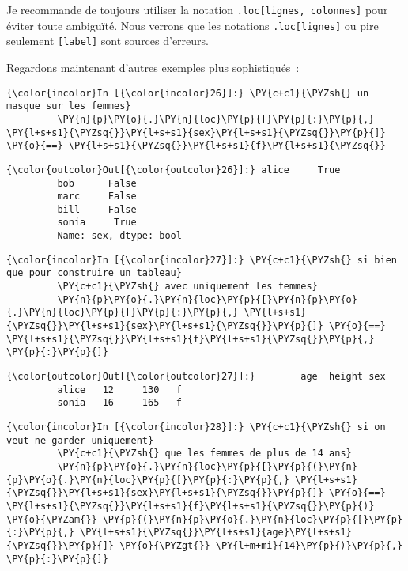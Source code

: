 Je recommande de toujours utiliser la notation
\texttt{.loc{[}lignes,\ colonnes{]}} pour éviter toute ambiguïté. Nous
verrons que les notations \texttt{.loc{[}lignes{]}} ou pire seulement
\texttt{{[}label{]}} sont sources d'erreurs.

Regardons maintenant d'autres exemples plus sophistiqués~:

    \begin{Verbatim}[commandchars=\\\{\}]
{\color{incolor}In [{\color{incolor}26}]:} \PY{c+c1}{\PYZsh{} un masque sur les femmes}
         \PY{n}{p}\PY{o}{.}\PY{n}{loc}\PY{p}{[}\PY{p}{:}\PY{p}{,} \PY{l+s+s1}{\PYZsq{}}\PY{l+s+s1}{sex}\PY{l+s+s1}{\PYZsq{}}\PY{p}{]} \PY{o}{==} \PY{l+s+s1}{\PYZsq{}}\PY{l+s+s1}{f}\PY{l+s+s1}{\PYZsq{}}
\end{Verbatim}


\begin{Verbatim}[commandchars=\\\{\}]
{\color{outcolor}Out[{\color{outcolor}26}]:} alice     True
         bob      False
         marc     False
         bill     False
         sonia     True
         Name: sex, dtype: bool
\end{Verbatim}
            
    \begin{Verbatim}[commandchars=\\\{\}]
{\color{incolor}In [{\color{incolor}27}]:} \PY{c+c1}{\PYZsh{} si bien que pour construire un tableau}
         \PY{c+c1}{\PYZsh{} avec uniquement les femmes}
         \PY{n}{p}\PY{o}{.}\PY{n}{loc}\PY{p}{[}\PY{n}{p}\PY{o}{.}\PY{n}{loc}\PY{p}{[}\PY{p}{:}\PY{p}{,} \PY{l+s+s1}{\PYZsq{}}\PY{l+s+s1}{sex}\PY{l+s+s1}{\PYZsq{}}\PY{p}{]} \PY{o}{==} \PY{l+s+s1}{\PYZsq{}}\PY{l+s+s1}{f}\PY{l+s+s1}{\PYZsq{}}\PY{p}{,} \PY{p}{:}\PY{p}{]}
\end{Verbatim}


\begin{Verbatim}[commandchars=\\\{\}]
{\color{outcolor}Out[{\color{outcolor}27}]:}        age  height sex
         alice   12     130   f
         sonia   16     165   f
\end{Verbatim}
            
    \begin{Verbatim}[commandchars=\\\{\}]
{\color{incolor}In [{\color{incolor}28}]:} \PY{c+c1}{\PYZsh{} si on veut ne garder uniquement}
         \PY{c+c1}{\PYZsh{} que les femmes de plus de 14 ans}
         \PY{n}{p}\PY{o}{.}\PY{n}{loc}\PY{p}{[}\PY{p}{(}\PY{n}{p}\PY{o}{.}\PY{n}{loc}\PY{p}{[}\PY{p}{:}\PY{p}{,} \PY{l+s+s1}{\PYZsq{}}\PY{l+s+s1}{sex}\PY{l+s+s1}{\PYZsq{}}\PY{p}{]} \PY{o}{==} \PY{l+s+s1}{\PYZsq{}}\PY{l+s+s1}{f}\PY{l+s+s1}{\PYZsq{}}\PY{p}{)} \PY{o}{\PYZam{}} \PY{p}{(}\PY{n}{p}\PY{o}{.}\PY{n}{loc}\PY{p}{[}\PY{p}{:}\PY{p}{,} \PY{l+s+s1}{\PYZsq{}}\PY{l+s+s1}{age}\PY{l+s+s1}{\PYZsq{}}\PY{p}{]} \PY{o}{\PYZgt{}} \PY{l+m+mi}{14}\PY{p}{)}\PY{p}{,} \PY{p}{:}\PY{p}{]}
\end{Verbatim}


